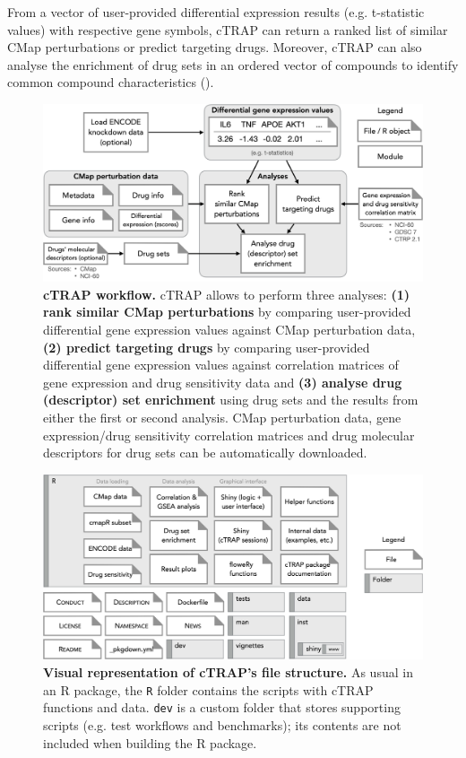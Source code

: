 From a vector of user-provided differential expression results (e.g. t-statistic values) with respective gene symbols, cTRAP can return a ranked list of similar CMap perturbations or predict targeting drugs. Moreover, cTRAP can also analyse the enrichment of drug sets in an ordered vector of compounds to identify common compound characteristics ().

\begin{figure}[!ht]
  \includegraphics[width=1\textwidth]{images/ctrap/workflow}
  \centering
  \caption[cTRAP workflow]{\textbf{cTRAP workflow.} cTRAP allows to perform three analyses: \textbf{(1) rank similar CMap perturbations} by comparing user-provided differential gene expression values against CMap perturbation data, \textbf{(2) predict targeting drugs} by comparing user-provided differential gene expression values against correlation matrices of gene expression and drug sensitivity data and \textbf{(3) analyse drug (descriptor) set enrichment} using drug sets and the results from either the first or second analysis. CMap perturbation data, gene expression/drug sensitivity correlation matrices and drug molecular descriptors for drug sets can be automatically downloaded.}
  \label{fig:ctrap-workflow}
\end{figure}

\begin{figure}[!ht]
  \includegraphics[width=1\textwidth]{images/ctrap/file-structure}
  \centering
  \caption[cTRAP file structure]{\textbf{Visual representation of cTRAP's file structure.} As usual in an R package, the \texttt{R} folder contains the scripts with cTRAP functions and data. \texttt{dev} is a custom folder that stores supporting scripts (e.g. test workflows and benchmarks); its contents are not included when building the R package.}
  \label{fig:ctrap-file-structure}
\end{figure}

